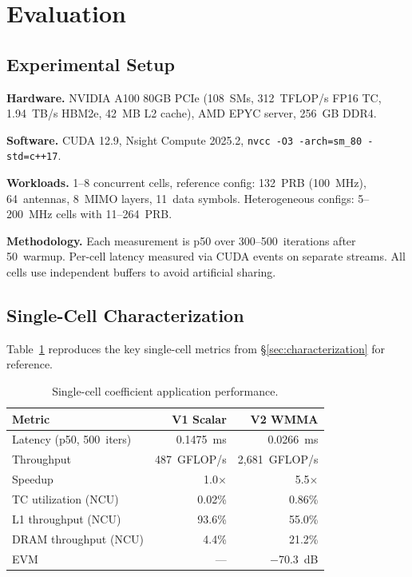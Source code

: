 \section{Evaluation}
\label{sec:evaluation}

\subsection{Experimental Setup}

\textbf{Hardware.} NVIDIA A100 80GB PCIe (108~SMs, 312~TFLOP/s FP16 TC, 1.94~TB/s HBM2e, 42~MB L2 cache), AMD EPYC server, 256~GB DDR4.

\textbf{Software.} CUDA 12.9, Nsight Compute 2025.2, \texttt{nvcc -O3 -arch=sm\_80 -std=c++17}.

\textbf{Workloads.} 1--8 concurrent cells, reference config: 132~PRB (100~MHz), 64~antennas, 8~MIMO layers, 11~data symbols. Heterogeneous configs: 5--200~MHz cells with 11--264~PRB.

\textbf{Methodology.} Each measurement is p50 over 300--500~iterations after 50~warmup. Per-cell latency measured via CUDA events on separate streams. All cells use independent buffers to avoid artificial sharing.

\subsection{Single-Cell Characterization}

Table~\ref{tab:eval_single} reproduces the key single-cell metrics from \S\ref{sec:characterization} for reference.

\begin{table}[h]
\centering
\small
\caption{Single-cell coefficient application performance.}
\label{tab:eval_single}
\begin{tabular}{lrr}
\toprule
Metric & V1 Scalar & V2 WMMA \\
\midrule
Latency (p50, 500~iters) & 0.1475~ms & 0.0266~ms \\
Throughput & 487~GFLOP/s & 2,681~GFLOP/s \\
Speedup & 1.0$\times$ & 5.5$\times$ \\
TC utilization (NCU) & 0.02\% & 0.86\% \\
L1 throughput (NCU) & 93.6\% & 55.0\% \\
DRAM throughput (NCU) & 4.4\% & 21.2\% \\
EVM & --- & $-$70.3~dB \\
\bottomrule
\end{tabular}
\end{table}

